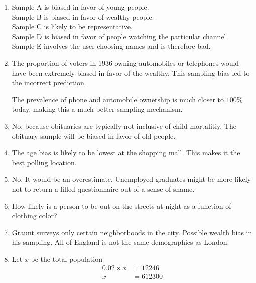 \begin{enumerate}[leftmargin = \labelsep, label=\textbf{\arabic*.}]
	\item Sample A is biased in favor of young people. \\ Sample B is biased in favor of wealthy people.  \\ Sample C is likely to be representative. \\ Sample D is biased in favor of people watching the particular channel. \\ Sample E involves the user choosing names and is therefore bad.
	
	\item The proportion of voters in 1936 owning automobiles or telephones would have been extremely biased in favor of the wealthy. This sampling bias led to the incorrect prediction.
	
	The prevalence of phone and automobile ownership is much closer to $ 100 \% $ today, making this a much better sampling mechanism. 
	
	\item No, because obituaries are typically not inclusive of child mortalitiy. The obituary sample will be biased in favor of old people.
	
	\item The age bias is likely to be lowest at the shopping mall. This makes it the best polling location.
	
	\item No. It would be an overestimate. Unemployed graduates might be more likely not to return a filled questionnaire out of a sense of shame. 
	
	\item How likely is a person to be out on the streets at night as a function of clothing color? 
	
	\item Graunt surveys only certain neighborhoods in the city. Possible wealth bias in his sampling. All of England is not the same demographics as London.
	
	\item Let $ x $ be the total population \\
	
	\begin{subequations}
		\begin{align}
			0.02 \times x &= 12246 \\
			x &= 612300
		\end{align}
	\end{subequations}
	

\end{enumerate}
